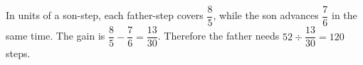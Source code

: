 In units of a son-step, each father-step covers $\dfrac{8}{5}$, while the son advances $\dfrac{7}{6}$ in the same time. The gain is $\dfrac{8}{5}-\dfrac{7}{6}=\dfrac{13}{30}$. Therefore the father needs $52\div\dfrac{13}{30}=\boxed{120}$ steps.
